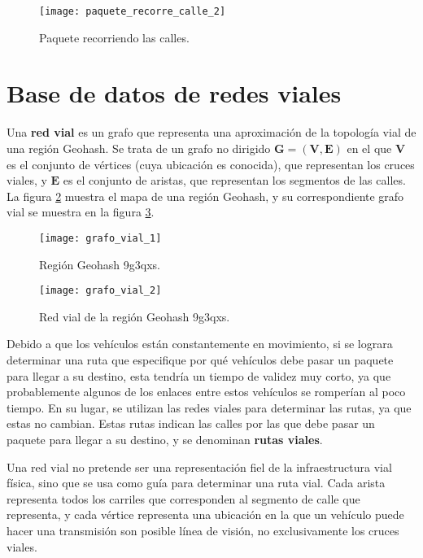 \begin{figure}[th]
\centering
\texttt{[image: paquete\_recorre\_calle\_2]}
\decoRule
\caption[Paquete recorriendo las calles]{Paquete recorriendo las calles.}
\label{fig:paquete_recorre_calle_2}
\end{figure}

\section{Base de datos de redes viales}
\label{sec:base_de_datos_deredes_viales}

Una \textbf{red vial} es un grafo que representa una aproximación de la
topología vial de una región Geohash. Se trata de un grafo no dirigido
$\mathbf{G}=(\mathbf{V},\mathbf{E})$ en el que $\mathbf{V}$ es el conjunto de
vértices (cuya ubicación es conocida), que representan los cruces viales, y
$\mathbf{E}$ es el conjunto de aristas, que representan los segmentos de las
calles. La figura \ref{fig:red_vial_1} muestra el mapa de una región Geohash, y
su correspondiente grafo vial se muestra en la figura \ref{fig:red_vial_2}.

\begin{figure}[th!]
\centering
\texttt{[image: grafo\_vial\_1]} 
\decoRule
\caption[Región Geohash 9g3qxs]{Región Geohash 9g3qxs.}
\label{fig:red_vial_1}
\end{figure}

\begin{figure}[th!]
\centering
\texttt{[image: grafo\_vial\_2]} 
\decoRule
\caption[Red vial de la región Geohash 9g3qxs]{Red vial de la región
Geohash 9g3qxs.}
\label{fig:red_vial_2}
\end{figure}

Debido a que los vehículos están constantemente en movimiento, si se lograra
determinar una ruta que especifique por qué vehículos debe pasar un paquete para
llegar a su destino, esta tendría un tiempo de validez muy corto, ya que
probablemente algunos de los enlaces entre estos vehículos se romperían al poco
tiempo. En su lugar, se utilizan las redes viales para determinar las rutas, ya
que estas no cambian. Estas rutas indican las calles por las que debe pasar un
paquete para llegar a su destino, y se denominan \textbf{rutas viales}.

Una red vial no pretende ser una representación fiel de la infraestructura vial
física, sino que se usa como guía para determinar una ruta vial. Cada arista
representa todos los carriles que corresponden al segmento de calle que
representa, y cada vértice representa una ubicación en la que un vehículo puede
hacer una transmisión son posible línea de visión, no exclusivamente los cruces
viales.

